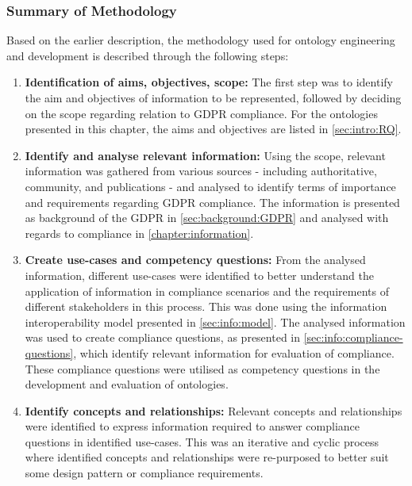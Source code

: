 
\subsubsection*{Summary of Methodology}
Based on the earlier description, the methodology used for ontology engineering and development is described through the following steps:
\begin{enumerate}
    \item \textbf{Identification of aims, objectives, scope:} The first step was to identify the aim and objectives of information to be represented, followed by deciding on the scope regarding relation to GDPR compliance. For the ontologies presented in this chapter, the aims and objectives are listed in \autoref{sec:intro:RQ}. %
    \item \textbf{Identify and analyse relevant information:} Using the scope, relevant information was gathered from various sources - including authoritative, community, and publications - and analysed to identify terms of importance and requirements regarding GDPR compliance. The information is presented as background of the GDPR in \autoref{sec:background:GDPR} and analysed with regards to compliance in \autoref{chapter:information}.
    \item \textbf{Create use-cases and competency questions:} From the analysed information, different use-cases were identified to better understand the application of information in compliance scenarios and the requirements of different stakeholders in this process. This was done using the information interoperability model presented in \autoref{sec:info:model}. The analysed information was used to create compliance questions, as presented in \autoref{sec:info:compliance-questions}, which identify relevant information for evaluation of compliance. These compliance questions were utilised as competency questions in the development and evaluation of ontologies.
    \item \textbf{Identify concepts and relationships:} Relevant concepts and relationships were identified to express information required to answer compliance questions in identified use-cases. This was an iterative and cyclic process where identified concepts and relationships were re-purposed to better suit some design pattern or compliance requirements.

\end{enumerate}
